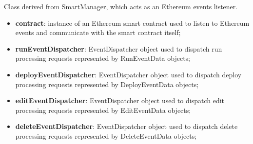 	Class derived from SmartManager, which acts as an Ethereum events listener.
	\begin{itemize}
		\item \textbf{contract}: instance of an Ethereum smart contract used to listen to Ethereum events and communicate with the smart contract itself;
		\item \textbf{runEventDispatcher}: EventDispatcher object used to dispatch run processing requests represented by RunEventData objects;
		\item \textbf{deployEventDispatcher}: EventDispatcher object used to dispatch deploy processing requests represented by DeployEventData objects;
		\item \textbf{editEventDispatcher}: EventDispatcher object used to dispatch edit processing requests represented by EditEventData objects;
		\item \textbf{deleteEventDispatcher}: EventDispatcher object used to dispatch delete processing requests represented by DeleteEventData objects;
	\end{itemize}
